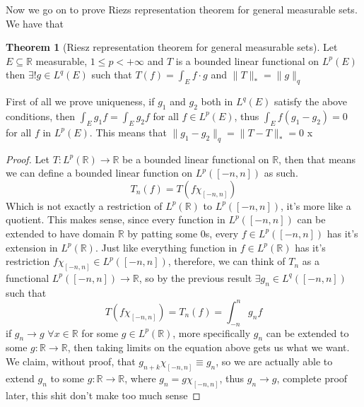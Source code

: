 \documentclass[12pt]{article}
\theoremstyle{definition}
\newtheorem{theorem}{Theorem}[section]
\begin{document}
	Now we go on to prove Riezs representation theorem for general measurable sets. We have that 
	\begin{theorem}[Riesz representation theorem for general measurable sets]
		Let $E \subseteq \mathbb{R}$ measurable, $1 \leq p < +\infty$ and $T$ is a bounded linear functional on $L^p(E)$ then $\exists! g \in L^q(E)$ such that $T(f) = \int_{E} f\cdot g$ and $\|T\|_* = \|g\|_q$
	\end{theorem}
	First of all we prove uniqueness, if $g_1$ and $g_2$ both in $L^q(E)$ satisfy the above conditions, then $\int_E g_1 f = \int_E g_2 f$ for all $f \in L^p(E)$, thus $\int_E f (g_1-g_2) = 0$ for all $f$ in $L^p(E)$. This means that $\|g_1 - g_2\|_q = \|T - T\|_* = 0$ x
	\begin{proof}
		Let $T \colon L^p(\mathbb{R}) \to \mathbb{R}$ be a bounded linear functional on $\mathbb{R}$, then that means we can define a bounded linear function on $L^p([-n,n])$ as such. 
		$$ T_n(f) = T(f \chi_{[-n,n]}) $$
		Which is not exactly a restriction of $L^p(\mathbb{R})$ to $L^p([-n,n])$, it's more like a quotient. This makes sense, since every function in $L^p([-n,n])$ can be extended to have domain $\mathbb{R}$ by patting some $0$s, every $f \in L^p([-n,n])$ has it's extension in $L^p(\mathbb{R})$. Just like everything function in $f \in L^p(\mathbb{R})$ has it's restriction $f \chi_{[-n,n]} \in L^p([-n,n])$,  therefore, we can think of $T_n$ as a functional $L^p([-n,n]) \to \mathbb{R}$, so by the previous result $\exists g_n \in L^q([-n,n])$ such that 
		$$T(f \chi_{[-n,n]}) = T_n(f) = \int_{-n}^n g_n f  $$
		if $g_n \to g$ $\forall x \in \mathbb{R}$ for some $g \in L^p(\mathbb{R})$, more specifically $g_n$ can be extended to some $g\colon \mathbb{R} \to \mathbb{R}$, then taking limits on the equation above gets us what we want. We claim, without proof, that $g_{n+k} \chi_{[-n,n]} \equiv g_n$, so we are actually able to extend $g_n$ to some $g \colon \mathbb{R} \to \mathbb{R}$, where $g_n = g \chi_{[-n,n]}$, thus $g_n \to g$,
		complete proof later, this shit don't make too much sense
		
		
	\end{proof}
\end{document}
